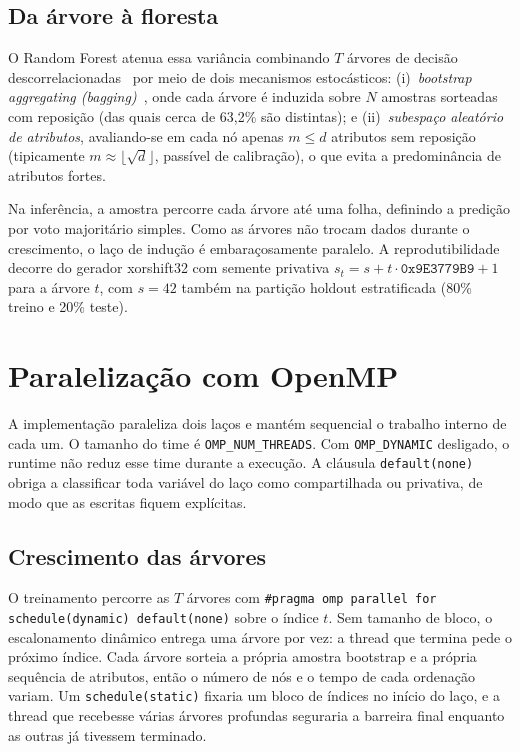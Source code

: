 \documentclass[12pt]{article}
\begin{document}
\subsection{Da árvore à floresta}

O Random Forest atenua essa variância combinando $T$ árvores de decisão
descorrelacionadas~\cite{breiman:2001} por meio de dois mecanismos estocásticos:
(i)~\textit{bootstrap aggregating (bagging)}~\cite{breiman:1996}, onde cada árvore é
induzida sobre $N$ amostras sorteadas com reposição (das quais cerca de 63{,}2\% são
distintas); e (ii)~\textit{subespaço aleatório de atributos}, avaliando-se em cada nó
apenas $m \le d$ atributos sem reposição (tipicamente $m \approx \lfloor\sqrt{d}\rfloor$, passível de calibração), o que evita a
predominância de atributos fortes.

Na inferência, a amostra percorre cada árvore até uma folha, definindo a predição por
voto majoritário simples. Como as árvores não trocam dados durante o crescimento, o laço
de indução é embaraçosamente paralelo. A reprodutibilidade decorre do gerador xorshift32
com semente privativa $s_t = s + t \cdot \texttt{0x9E3779B9} + 1$ para a árvore $t$, com
$s = 42$ também na partição holdout estratificada (80\% treino e 20\% teste).

\section{Paralelização com OpenMP}
\label{sec:impl}

A implementação paraleliza dois laços e mantém sequencial o trabalho interno de cada
um. O tamanho do time é \texttt{OMP\_NUM\_THREADS}. Com \texttt{OMP\_DYNAMIC}
desligado, o runtime não reduz esse time durante a execução. A cláusula
\texttt{default(none)} obriga a classificar toda variável do laço como compartilhada
ou privativa, de modo que as escritas fiquem explícitas.

\subsection{Crescimento das árvores}

O treinamento percorre as $T$ árvores com
\texttt{\#pragma omp parallel for schedule(dynamic) default(none)} sobre o índice
$t$. Sem tamanho de bloco, o escalonamento dinâmico entrega uma árvore por vez: a
thread que termina pede o próximo índice. Cada árvore sorteia a própria amostra
bootstrap e a própria sequência de atributos, então o número de nós e o tempo de
cada ordenação variam. Um \texttt{schedule(static)} fixaria um bloco de índices no
início do laço, e a thread que recebesse várias árvores profundas seguraria a
barreira final enquanto as outras já tivessem terminado.
\end{document}
